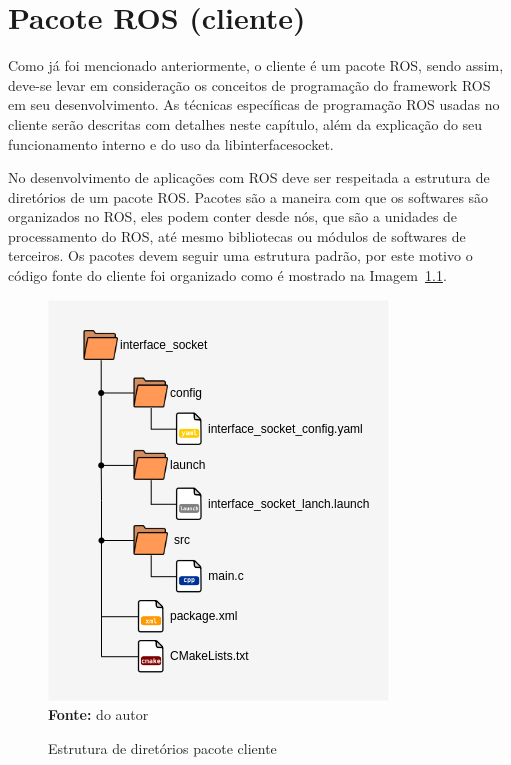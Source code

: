 \chapter{Pacote ROS (cliente)}\label{cap:cliente}

Como já foi mencionado anteriormente, o cliente é um pacote ROS, sendo assim, deve-se levar em consideração os conceitos de programação do framework ROS em seu desenvolvimento. As técnicas específicas de programação ROS usadas no cliente serão descritas com detalhes neste capítulo, além da explicação do seu funcionamento interno e do uso da libinterfacesocket.

No desenvolvimento de aplicações com ROS deve ser respeitada a estrutura de diretórios  de um pacote ROS\@. Pacotes são a maneira com que os softwares são organizados no ROS, eles podem conter desde nós, que são a unidades de processamento do ROS, até mesmo bibliotecas ou módulos de softwares de terceiros. Os pacotes devem seguir uma estrutura padrão, por este motivo o código fonte do cliente foi organizado como é mostrado na Imagem~\ref{fig:clientdiretorios}.

\begin{figure}[ht]
	\caption{Estrutura de diretórios pacote cliente}
	\begin{center}
		\includegraphics[scale=0.42]{imagens/rospackage.png}\\
		{\small \textbf{Fonte:} do autor}
    \end{center}\label{fig:clientdiretorios}
\end{figure}

